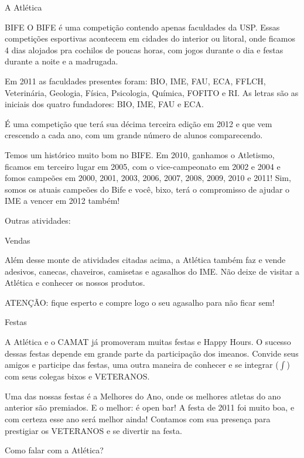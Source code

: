 \begin{secao}{A Atlética}
\begin{subsecao}{BIFE}
O BIFE é uma competição contendo apenas faculdades da USP. Essas competições
esportivas acontecem em cidades do interior ou litoral, onde ficamos 4 dias
alojados pra cochilos de poucas horas, com jogos durante o dia e festas durante
a noite e a madrugada.

Em 2011 as faculdades presentes foram: BIO, IME, FAU, ECA, FFLCH, Veterinária,
Geologia, Física, Psicologia, Química, FOFITO e RI. As letras são as iniciais
dos quatro fundadores: BIO, IME, FAU e ECA.

É uma competição que terá sua décima terceira edição em 2012 e que vem
crescendo a cada ano, com um grande número de alunos comparecendo.

Temos um histórico muito bom no BIFE. Em 2010, ganhamos o Atletismo, ficamos em
terceiro lugar em 2005, com o vice-campeonato em 2002 e 2004 e fomos campeões
em 2000, 2001, 2003, 2006, 2007, 2008, 2009, 2010 e 2011! Sim, somos os atuais
campeões do Bife e você, bixo, terá o compromisso de ajudar o IME a vencer
em 2012 também!

\end{subsecao}

Outras atividades:

\begin{subsecao}{Vendas}

Além desse monte de atividades citadas acima, a Atlética também faz e vende
adesivos, canecas, chaveiros, camisetas e agasalhos do IME. Não deixe de
visitar a Atlética e conhecer os nossos produtos.

ATENÇÃO: fique esperto e compre logo o seu agasalho para não ficar sem!

\end{subsecao}
\begin{subsecao}{Festas}

A Atlética e o CAMAT já promoveram muitas festas e Happy Hours. O sucesso
dessas festas depende em grande parte da participação dos imeanos. Convide seus
amigos e participe das festas, uma outra maneira de conhecer e se
integrar ($\int$) com seus colegas bixos e VETERANOS.

Uma das nossas festas é a Melhores do Ano, onde os melhores atletas do ano
anterior são premiados. E o melhor: é open bar! A festa de 2011 foi muito boa,
e com certeza esse ano será melhor ainda! Contamos com sua presença para
prestigiar os VETERANOS e se divertir na festa.

\end{subsecao}
\begin{subsecao}{Como falar com a Atlética?}


\end{subsecao}
\end{secao}
